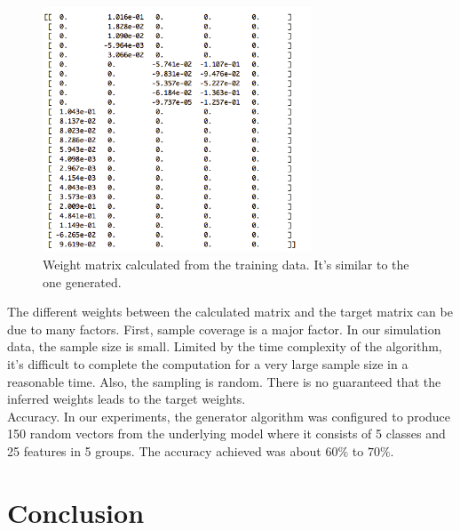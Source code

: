\documentclass[11pt]{article}
\begin{document}
\begin{figure}[ht]
\begin{center}
	\includegraphics[width=8cm,natwidth=200, natheight=186]{m2_img}
	\caption{Weight matrix calculated from the training data. It's similar to the one generated.}
\end{center}
\end{figure} 

The different weights between the calculated matrix and the target matrix can be due to many factors. First, sample coverage is a major factor. In our simulation data, the sample size is small. Limited by the time complexity of the algorithm, it's difficult to complete the computation for a very large sample size in a reasonable time. Also, the sampling is random. There is no guaranteed that the inferred weights leads to the target weights. \\   

Accuracy. In our experiments, the generator algorithm was configured to produce 150 random vectors from the underlying model where it consists of 5 classes and 25 features in 5 groups. The accuracy achieved was about $60\%$ to $70\%$. \\

\section{Conclusion}
%
%
\end{document}
